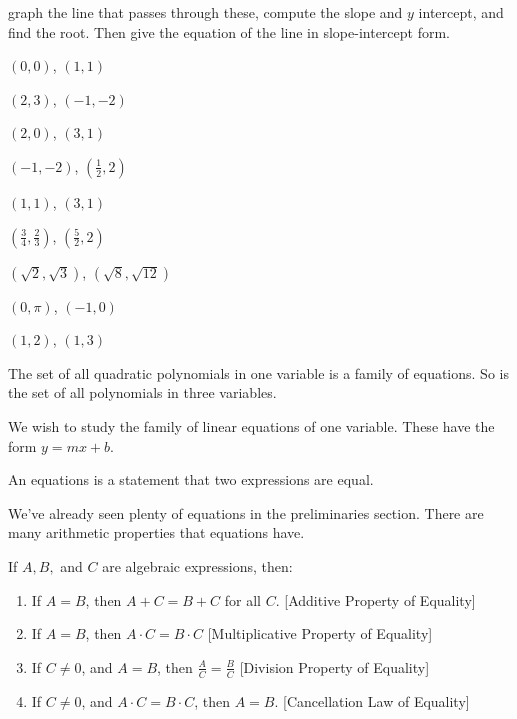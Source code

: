\documentclass[crop=false,class=book,oneside]{standalone}                      %
\begin{document}
\begin{lexample}
                graph the line that passes through these, compute
                the slope and $y$ intercept, and find the root.
                Then give the equation of the line in slope-intercept
                form.
                \begin{enumerate}
                    \begin{multicols}{3}
                        \item $(0,0)$, $(1,1)$
                        \item $(2,3)$, $(\minus{1},\minus{2})$
                        \item $(2,0)$, $(3,1)$
                        \item $(\minus{1},\minus{2})$, $(\frac{1}{2},2)$
                        \item $(1,1)$, $(3,1)$
                        \item $(\frac{3}{4},\frac{2}{3})$, $(\frac{5}{2},2)$
                        \item $(\sqrt{2},\sqrt{3})$, $(\sqrt{8},\sqrt{12})$
                        \item $(0,\pi)$, $(\minus{1},0)$
                        \item $(1,2)$, $(1,3)$
                    \end{multicols}
                \end{enumerate}
            \end{lexample}
        \begin{example}
            The set of all quadratic polynomials in one variable is a family
            of equations. So is the set of all polynomials in three variables.
        \end{example}
        We wish to study the family of linear equations of one variable. These have the form $y=mx+b$.
        \begin{definition}
        An equations is a statement that two expressions are equal.
        \end{definition}
        We've already seen plenty of equations in the preliminaries section. There are many arithmetic properties that equations have.
        \begin{properties}
        If $A,B,$ and $C$ are algebraic expressions, then:
        \begin{enumerate}
        \item If $A=B$, then $A+C=B+C$ for all $C$. \hfill [Additive Property of Equality]
        \item If $A=B$, then $A\cdot C = B\cdot C$ \hfill [Multiplicative Property of Equality]
        \item If $C \ne 0$, and $A=B$, then $\frac{A}{C} = \frac{B}{C}$ \hfill [Division Property of Equality]
        \item If $C\ne 0$, and $A\cdot C = B\cdot C$, then $A=B$. \hfill [Cancellation Law of Equality]
        \end{enumerate}
        \end{properties}
\end{document}
